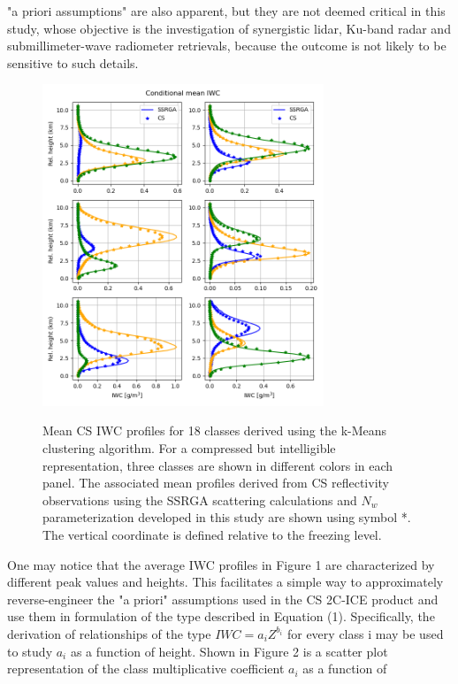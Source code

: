 \documentclass{ametsocV6.1}
\begin{document}
"a priori assumptions" are also apparent, but they are not deemed critical in this study, whose objective is 
the investigation of synergistic lidar, Ku-band radar and submillimeter-wave radiometer retrievals, because the 
outcome is not likely to be sensitive to such details.
\begin{figure}[t]
    \centering
    \includegraphics[width=0.75\textwidth,angle=0]{./Figs/fig01.png}\\
    \caption{Mean CS IWC profiles for 18 classes derived using the k-Means clustering algorithm. For a 
    compressed but intelligible representation, three classes are shown in different colors in each panel.
    The associated 
    mean profiles derived from CS reflectivity observations using the SSRGA scattering calculations 
    and $N_w$ parameterization developed in this study are shown using symbol *. The vertical coordinate 
    is defined relative to the freezing level.}\label{f1}
\end{figure}
One may notice that the average IWC profiles in Figure 1 are characterized by different peak values and heights. 
This facilitates a simple way to approximately reverse-engineer the "a priori" assumptions used in the CS 
2C-ICE product and use them in formulation of the type described in Equation (1).  Specifically, the  
derivation of relationships of the type $IWC=a_i Z^{b_i}$ for every class i may be used to study $a_i$ as a
function of height. 
Shown in Figure 2 is a  scatter plot representation of the class multiplicative coefficient $a_i$ as a function of
\end{document}
